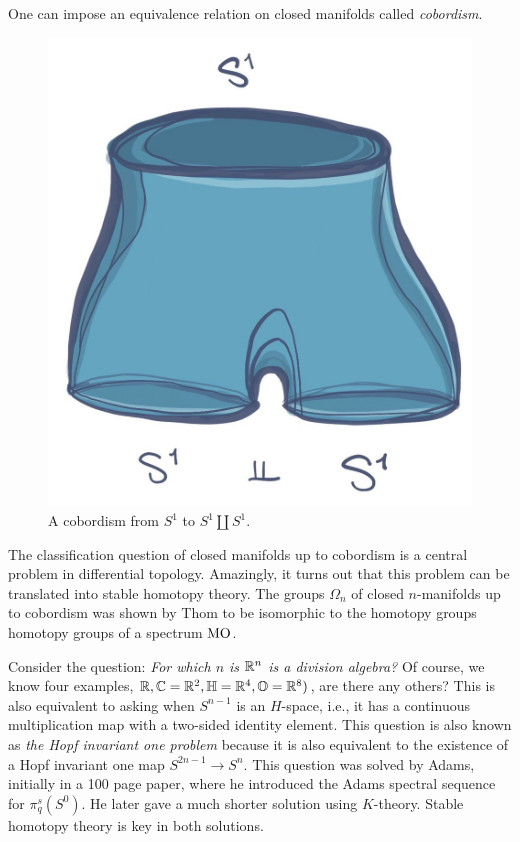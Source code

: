\documentclass{article}[11pt]
\begin{document}
\begin{example} One can impose an equivalence relation on closed  manifolds called \emph{cobordism}. 

\begin{figure}[h]
  \includegraphics[scale=1]{pics/cobordism.png}
  \centering
  \caption{A cobordism from $S^1$ to $S^1\amalg S^1 $.}
  \label{fig:cob}
\end{figure}

 The classification question of closed  manifolds up to cobordism is a central problem in differential topology. Amazingly, it turns out that this problem can be translated into stable homotopy theory. The groups $\Omega_n$ of closed  $n$-manifolds up to cobordism was shown by Thom to be isomorphic to the homotopy groups homotopy groups of a spectrum $\text{MO}$.
\end{example}

\begin{example} Consider the question: \emph{For which $n$ is $\mathbb{R}^n$ is a division algebra?} Of course, we know four examples, $\mathbb{R}, \mathbb{C}=\mathbb{R}^2, \mathbb{H}=\mathbb{R}^4, \mathbb{O}=\mathbb{R}^8)$, are there any others? This is also equivalent to asking when $S^{n-1}$ is an $H$-space, i.e., it has a continuous multiplication map with a two-sided identity element. This question is also known as \emph{the Hopf invariant one problem} because it is also equivalent to the existence of a Hopf invariant one map $S^{2n-1}\to S^n$. This question was  solved by Adams, initially in a 100 page paper, where he introduced the Adams spectral sequence for $\pi_q^s(S^0)$. He later gave a much shorter solution using $K$-theory. Stable homotopy theory is key in both solutions.
\end{example}
\end{document}
